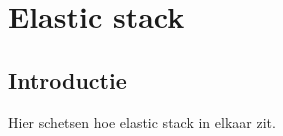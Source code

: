 
\chapter{Elastic stack}
\label{ch:elasticstack}


\section{Introductie}
Hier schetsen hoe elastic stack in elkaar zit.